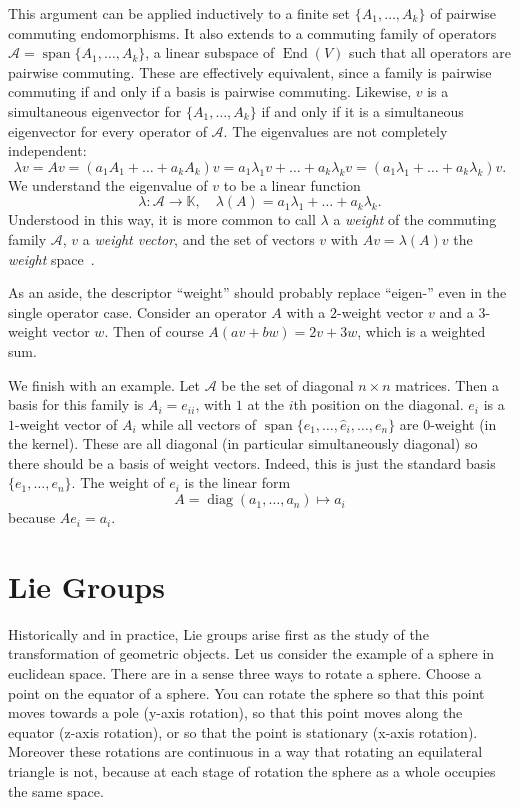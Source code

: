 \documentclass[twoside,11pt,a4paper,leqno]{article}
\numberwithin{equation}{section}
\theoremstyle{plain}
\theoremstyle{definition}
\DeclareMathOperator{\vspan}{span}
\DeclareMathOperator{\End}{End}
\begin{document}
This argument can be applied inductively to a finite set $\{A_1,\dots,A_k\}$ of pairwise commuting endomorphisms.
It also extends to a commuting family of operators $\mathcal{A} = \vspan\{A_1,\dots,A_k\}$, a linear subspace of $\End(V)$ such that all operators are pairwise commuting.
These are effectively equivalent, since a family is pairwise commuting if and only if a basis is pairwise commuting.
Likewise, $v$ is a simultaneous eigenvector for $\{A_1,\dots,A_k\}$ if and only if it is a simultaneous eigenvector for every operator of $\mathcal{A}$.
The eigenvalues are not completely independent:
\[
\lambda v
= Av 
= (a_1A_1 + \dots + a_kA_k)v
= a_1 \lambda_1 v + \dots + a_k \lambda_k v
= (a_1 \lambda_1 + \dots + a_k \lambda_k )v.
\]
We understand the eigenvalue of $v$ to be a linear function 
\[
\lambda : \mathcal{A} \to \mathbb{K}, 
\quad
\lambda(A) = a_1 \lambda_1 + \dots + a_k \lambda_k .
\]
Understood in this way, it is more common to call $\lambda$ a \emph{weight} of the commuting family $\mathcal{A}$, $v$ a \emph{weight vector}, and the set of vectors $v$ with $Av = \lambda(A)v$ the \emph{weight} space~\cite[Definition~A.14]{Hall2015}.

As an aside, the descriptor ``weight'' should probably replace ``eigen-'' even in the single operator case.
Consider an operator $A$ with a $2$-weight vector $v$ and a $3$-weight vector $w$.
Then of course $A(av+bw) = 2v + 3w$, which is a weighted sum.

We finish with an example.
Let $\mathcal{A}$ be the set of diagonal $n\times n$ matrices.
Then a basis for this family is $A_i = e_{ii}$, with $1$ at the $i$th position on the diagonal.
$e_i$ is a $1$-weight vector of $A_i$ while all vectors of $\vspan\{e_1,\dots,\hat{e}_i,\dots,e_n\}$ are $0$-weight (in the kernel).
These are all diagonal (in particular simultaneously diagonal) so there should be a basis of weight vectors.
Indeed, this is just the standard basis $\{e_1,\dots,e_n\}$.
The weight of $e_i$ is the linear form
\[
A = \operatorname{diag}(a_1,\dots,a_n) \mapsto a_i
\]
because $A e_i = a_i$.


\section{Lie Groups}

Historically and in practice, Lie groups arise first as the study of the transformation of geometric objects.
Let us consider the example of a sphere in euclidean space.
There are in a sense three ways to rotate a sphere.
Choose a point on the equator of a sphere.
You can rotate the sphere so that this point moves towards a pole (y-axis rotation), so that this point moves along the equator (z-axis rotation), or so that the point is stationary (x-axis rotation).
Moreover these rotations are continuous in a way that rotating an equilateral triangle is not, because at each stage of rotation the sphere as a whole occupies the same space.
\end{document}
